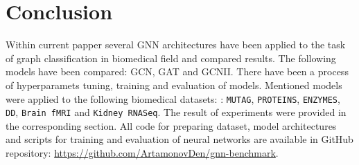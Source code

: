 \section{Conclusion}
\label{sec:conclusion}

Within current papper several GNN architectures have been applied to the task of graph classification
in biomedical field and compared results. The following models have been compared: GCN\cite{GCN}, GAT\cite{GAT} and GCNII\cite{GCNII}.
There have been a process of hyperparamets tuning, training and evaluation of models. Mentioned models were applied
to the following biomedical datasets: : \texttt{MUTAG}, \texttt{PROTEINS},
\texttt{ENZYMES}, \texttt{DD},  \texttt{Brain fMRI} and \texttt{Kidney RNASeq}. The result of experiments
were provided in the corresponding section. All code for preparing dataset, model architectures and scripts for 
training and evaluation of neural networks are available in GitHub repository: 
\url{https://github.com/ArtamonovDen/gnn-benchmark}.